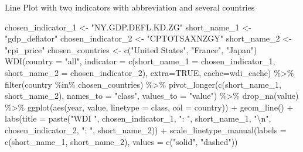 \documentclass[
]{bxjsbook}
\newenvironment{Shaded}{\begin{snugshade}}{\end{snugshade}}
\newcommand{\AttributeTok}[1]{\textcolor[rgb]{0.77,0.63,0.00}{#1}}
\newcommand{\ConstantTok}[1]{\textcolor[rgb]{0.00,0.00,0.00}{#1}}
\newcommand{\FunctionTok}[1]{\textcolor[rgb]{0.00,0.00,0.00}{#1}}
\newcommand{\NormalTok}[1]{#1}
\newcommand{\OtherTok}[1]{\textcolor[rgb]{0.56,0.35,0.01}{#1}}
\newcommand{\SpecialCharTok}[1]{\textcolor[rgb]{0.00,0.00,0.00}{#1}}
\newcommand{\StringTok}[1]{\textcolor[rgb]{0.31,0.60,0.02}{#1}}
\theoremstyle{definition}
\theoremstyle{definition}
\theoremstyle{definition}
\theoremstyle{definition}
\theoremstyle{remark}
\begin{document}
Line Plot with two indicators with abbreviation and several countries

\begin{Shaded}
\begin{Highlighting}[]
\NormalTok{chosen\_indicator\_1 }\OtherTok{\textless{}{-}} \StringTok{"NY.GDP.DEFL.KD.ZG"}
\NormalTok{short\_name\_1 }\OtherTok{\textless{}{-}} \StringTok{"gdp\_deflator"}
\NormalTok{chosen\_indicator\_2 }\OtherTok{\textless{}{-}} \StringTok{"CPTOTSAXNZGY"}
\NormalTok{short\_name\_2 }\OtherTok{\textless{}{-}} \StringTok{"cpi\_price"}
\NormalTok{chosen\_countries }\OtherTok{\textless{}{-}} \FunctionTok{c}\NormalTok{(}\StringTok{"United States"}\NormalTok{, }\StringTok{"France"}\NormalTok{, }\StringTok{"Japan"}\NormalTok{)}
\FunctionTok{WDI}\NormalTok{(}\AttributeTok{country =} \StringTok{"all"}\NormalTok{, }\AttributeTok{indicator =} \FunctionTok{c}\NormalTok{(}\AttributeTok{short\_name\_1 =}\NormalTok{ chosen\_indicator\_1, }\AttributeTok{short\_name\_2 =}\NormalTok{ chosen\_indicator\_2), }\AttributeTok{extra=}\ConstantTok{TRUE}\NormalTok{, }\AttributeTok{cache=}\NormalTok{wdi\_cache) }\SpecialCharTok{\%\textgreater{}\%} 
  \FunctionTok{filter}\NormalTok{(country }\SpecialCharTok{\%in\%}\NormalTok{ chosen\_countries) }\SpecialCharTok{\%\textgreater{}\%} 
  \FunctionTok{pivot\_longer}\NormalTok{(}\FunctionTok{c}\NormalTok{(short\_name\_1, short\_name\_2), }\AttributeTok{names\_to =} \StringTok{"class"}\NormalTok{, }\AttributeTok{values\_to =} \StringTok{"value"}\NormalTok{) }\SpecialCharTok{\%\textgreater{}\%} \FunctionTok{drop\_na}\NormalTok{(value) }\SpecialCharTok{\%\textgreater{}\%}
  \FunctionTok{ggplot}\NormalTok{(}\FunctionTok{aes}\NormalTok{(year, value, }\AttributeTok{linetype =}\NormalTok{ class, }\AttributeTok{col =}\NormalTok{ country)) }\SpecialCharTok{+} \FunctionTok{geom\_line}\NormalTok{() }\SpecialCharTok{+}
  \FunctionTok{labs}\NormalTok{(}\AttributeTok{title =} \FunctionTok{paste}\NormalTok{(}\StringTok{"WDI "}\NormalTok{, chosen\_indicator\_1, }\StringTok{": "}\NormalTok{, short\_name\_1, }\StringTok{"}\SpecialCharTok{\textbackslash{}n}\StringTok{"}\NormalTok{, chosen\_indicator\_2, }\StringTok{": "}\NormalTok{, short\_name\_2)) }\SpecialCharTok{+}
  \FunctionTok{scale\_linetype\_manual}\NormalTok{(}\AttributeTok{labels =} \FunctionTok{c}\NormalTok{(short\_name\_1, short\_name\_2), }\AttributeTok{values =} \FunctionTok{c}\NormalTok{(}\StringTok{"solid"}\NormalTok{, }\StringTok{"dashed"}\NormalTok{))}
\end{Highlighting}
\end{Shaded}
\end{document}
